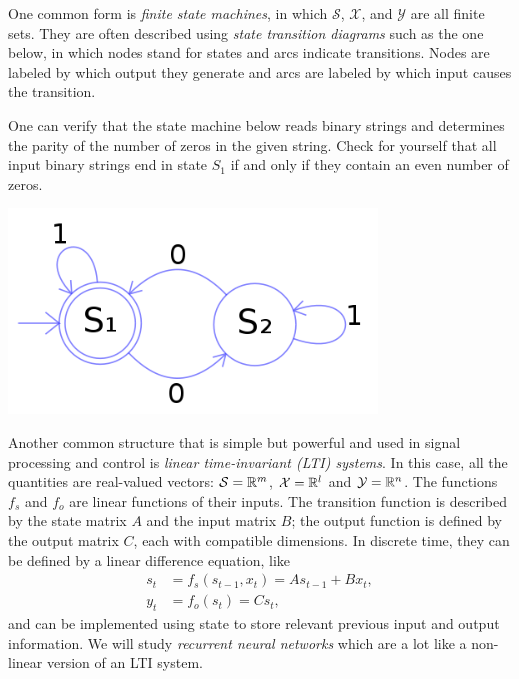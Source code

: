One common form is {\em finite state machines}, in which $\mathcal S$, $\mathcal X$, and $\mathcal Y$ are
all finite sets.  They are often described using {\em state transition
    diagrams} such as the one below, in
which nodes stand for states and arcs indicate transitions.  Nodes are
labeled by which output they generate and arcs are labeled by which
input causes the transition.  

\begin{examplebox}
  One can verify that the state machine below reads binary strings and
  determines the parity of the number of zeros in the given string.
  Check for yourself that all input binary strings end in state $S_1$ if
  and only if they contain an even number of zeros.
  \begin{center}
    \includegraphics[scale=1.0]{figures/FSM.png}
  \end{center}
\end{examplebox}

Another common structure that is simple but powerful and used in
signal processing and control is {\em linear time-invariant (LTI)
    systems}.  In this case, all
the quantities are real-valued vectors: $\mathcal S = \mathbb{R}^m$, $\mathcal
  X = \mathbb{R}^l$ and $\mathcal Y = \mathbb{R}^n$. The functions $f_s$ and $f_o$ are
linear functions of their inputs.
The transition function is described by the state matrix $A$ and the input matrix $B$;
the output function is defined by the output matrix $C$, each with compatible dimensions.
In discrete time, they can be
defined by a linear difference equation, like
\begin{align}
  s_t & = f_s(s_{t-1}, x_t) = A s_{t-1} + B x_t, \\
  y_t & = f_o(s_t) = C s_t, \;\;
\end{align}
and can be implemented using state to store relevant previous
input and output information.
We will study {\it{recurrent neural networks}} which are a lot like a
non-linear version of an LTI system.



